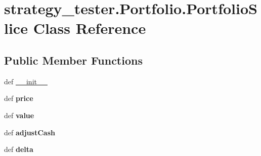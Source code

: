 \hypertarget{classstrategy__tester_1_1Portfolio_1_1PortfolioSlice}{\section{strategy\-\_\-tester.\-Portfolio.\-Portfolio\-Slice \-Class \-Reference}
\label{classstrategy__tester_1_1Portfolio_1_1PortfolioSlice}
}
\subsection*{\-Public \-Member \-Functions}
\begin{DoxyCompactItemize}
\item 
def \hyperlink{classstrategy__tester_1_1Portfolio_1_1PortfolioSlice_a6e7b201e94f9107fc6e28e18c801f13a}{\-\_\-\-\_\-init\-\_\-\-\_\-}
\item 
\hypertarget{classstrategy__tester_1_1Portfolio_1_1PortfolioSlice_aff2071a4d9fd610572ae54963e9d9d47}{def {\bfseries price}}\label{classstrategy__tester_1_1Portfolio_1_1PortfolioSlice_aff2071a4d9fd610572ae54963e9d9d47}

\item 
\hypertarget{classstrategy__tester_1_1Portfolio_1_1PortfolioSlice_a07486a0dd01d7bfef9de40c9716e7faa}{def {\bfseries value}}\label{classstrategy__tester_1_1Portfolio_1_1PortfolioSlice_a07486a0dd01d7bfef9de40c9716e7faa}

\item 
\hypertarget{classstrategy__tester_1_1Portfolio_1_1PortfolioSlice_a93270f4aa73d0a0c8ab8aae876e6025f}{def {\bfseries adjust\-Cash}}\label{classstrategy__tester_1_1Portfolio_1_1PortfolioSlice_a93270f4aa73d0a0c8ab8aae876e6025f}

\item 
\hypertarget{classstrategy__tester_1_1Portfolio_1_1PortfolioSlice_a9c19ca82a91a1c84c45bd5cc679bf975}{def {\bfseries delta}}\label{classstrategy__tester_1_1Portfolio_1_1PortfolioSlice_a9c19ca82a91a1c84c45bd5cc679bf975}

\end{DoxyCompactItemize}
